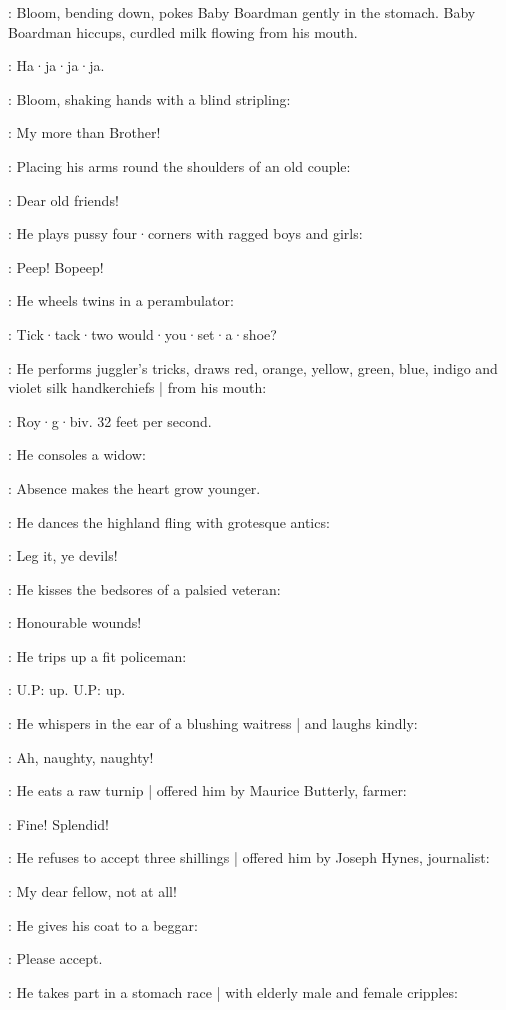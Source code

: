 :
Bloom,
bending down,
pokes Baby Boardman gently in the stomach.
Baby Boardman hiccups,
curdled milk flowing from his mouth.

\BabyBoardman:
Ha·ja·ja·ja.

:
Bloom,
shaking hands with a blind stripling:

\Bloom:
My more than Brother!

:
Placing his arms round the shoulders of an old couple:

\Bloom:
Dear old friends!

:
He plays pussy four·corners with ragged boys and girls:

\Bloom:
Peep!
Bopeep!

:
He wheels twins in a perambulator:

\Bloom:
Tick·tack·two would·you·set·a·shoe?

:
He performs juggler's tricks,
draws red,
orange,
yellow,
green,
blue,
indigo 
and violet silk handkerchiefs |
from his mouth:

\Bloom:
Roy·g·biv.
32 feet per second.

:
He consoles a widow:

\Bloom:
Absence makes the heart grow younger.

:
He dances the highland fling with grotesque antics:

\Bloom:
Leg it,
ye devils!

:
He kisses the bedsores of a palsied veteran:

\Bloom:
Honourable wounds!

:
He trips up a fit policeman:

\Bloom:
U.P:
up.
U.P:
up.

:
He whispers in the ear of a blushing waitress |
and laughs kindly:

\Bloom:
Ah,
naughty,
naughty!

:
He eats a raw turnip |
offered him by Maurice Butterly,
farmer:

\Bloom:
Fine!
Splendid!

:
He refuses to accept three shillings |
offered him by Joseph Hynes,
journalist:

\Bloom:
My dear fellow,
not at all!

:
He gives his coat to a beggar:

\Bloom:
Please accept.

:
He takes part in a stomach race |
with elderly male and female cripples:

